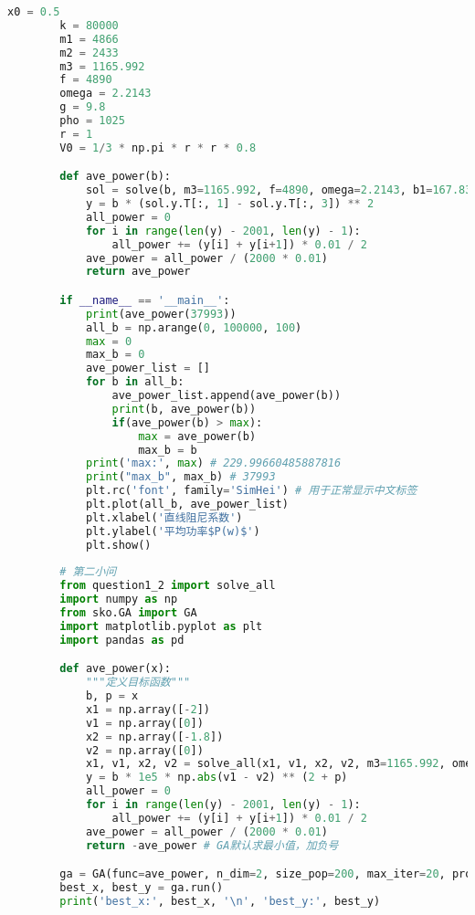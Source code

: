 \documentclass[withoutpreface,bwprint]{cumcmthesis} %
\begin{document}
\begin{appendices}
\begin{lstlisting}[language=python]
        x0 = 0.5
        k = 80000
        m1 = 4866
        m2 = 2433
        m3 = 1165.992
        f = 4890
        omega = 2.2143
        g = 9.8
        pho = 1025
        r = 1
        V0 = 1/3 * np.pi * r * r * 0.8

        def ave_power(b):
            sol = solve(b, m3=1165.992, f=4890, omega=2.2143, b1=167.8395)
            y = b * (sol.y.T[:, 1] - sol.y.T[:, 3]) ** 2
            all_power = 0
            for i in range(len(y) - 2001, len(y) - 1):
                all_power += (y[i] + y[i+1]) * 0.01 / 2
            ave_power = all_power / (2000 * 0.01)
            return ave_power

        if __name__ == '__main__':
            print(ave_power(37993))
            all_b = np.arange(0, 100000, 100)
            max = 0
            max_b = 0
            ave_power_list = []
            for b in all_b:
                ave_power_list.append(ave_power(b))
                print(b, ave_power(b))
                if(ave_power(b) > max):
                    max = ave_power(b)
                    max_b = b
            print('max:', max) # 229.99660485887816
            print("max_b", max_b) # 37993
            plt.rc('font', family='SimHei') # 用于正常显示中文标签 
            plt.plot(all_b, ave_power_list)
            plt.xlabel('直线阻尼系数')
            plt.ylabel('平均功率$P(w)$')
            plt.show()
        
        # 第二小问
        from question1_2 import solve_all
        import numpy as np
        from sko.GA import GA
        import matplotlib.pyplot as plt
        import pandas as pd

        def ave_power(x):
            """定义目标函数"""
            b, p = x
            x1 = np.array([-2])
            v1 = np.array([0])
            x2 = np.array([-1.8])
            v2 = np.array([0])
            x1, v1, x2, v2 = solve_all(x1, v1, x2, v2, m3=1165.992, omega=2.2143, f=4890, b0=b * 1e5, p=p, b1=167.8395)
            y = b * 1e5 * np.abs(v1 - v2) ** (2 + p)
            all_power = 0
            for i in range(len(y) - 2001, len(y) - 1):
                all_power += (y[i] + y[i+1]) * 0.01 / 2
            ave_power = all_power / (2000 * 0.01)
            return -ave_power # GA默认求最小值，加负号

        ga = GA(func=ave_power, n_dim=2, size_pop=200, max_iter=20, prob_mut=0.001, lb=[0.35, 0], ub=[0.45, 0.05], precision=1e-7)
        best_x, best_y = ga.run()
        print('best_x:', best_x, '\n', 'best_y:', best_y)


\end{lstlisting}
\end{appendices}
\end{document}
